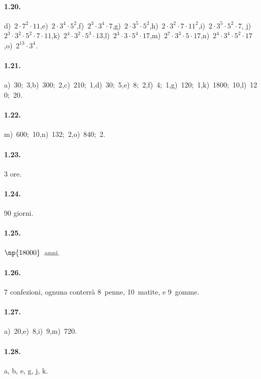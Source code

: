 \paragraph{1.20.}
d)~$2\cdot7^2\cdot11$,\quad e)~$2\cdot3^4\cdot5^2$,\quad f)~$2^3\cdot3^4\cdot7$,\quad g)~$2\cdot3^5\cdot5^2$,\quad h)~$2\cdot3^2\cdot7\cdot11^2$,\quad i)~$2\cdot3^5\cdot5^2\cdot7$,\quad
j)~$2^3\cdot3^2\cdot5^2\cdot7\cdot11$,\quad k)~$2^4\cdot3^2\cdot5^3\cdot13$,\quad l)~$2^3\cdot3\cdot5^4\cdot17$,\quad m)~$2^7\cdot3^3\cdot5\cdot17$,\quad n)~$2^4\cdot3^4\cdot5^2\cdot17$,\quad o)~$2^{13}\cdot3^4$.

\paragraph{1.21.}
a)~30;~3,\quad b)~300;~2,\quad c)~210;~1,\quad d)~30;~5,\quad e)~8;~2,\quad f)~4;~1,\quad g)~120;~1,\quad k)~1800;~10,\quad l)~120;~20.

\paragraph{1.22.}
m)~600;~10,\quad n)~132;~2,\quad o)~840;~2.

\begin{multicols}{3}
\paragraph{1.23.}
3 ore.

\paragraph{1.24.}
90 giorni.

\paragraph{1.25.}
$ \np{18000}$~anni.
\end{multicols}

\paragraph{1.26.}
7 confezioni, ognuna conterrà 8~penne, 10~matite, e 9~gomme.

\paragraph{1.27.}
a)~20,\quad e)~8,\quad i)~9,\quad m)~720.

\paragraph{1.28.}
a, b, e, g, j, k.

